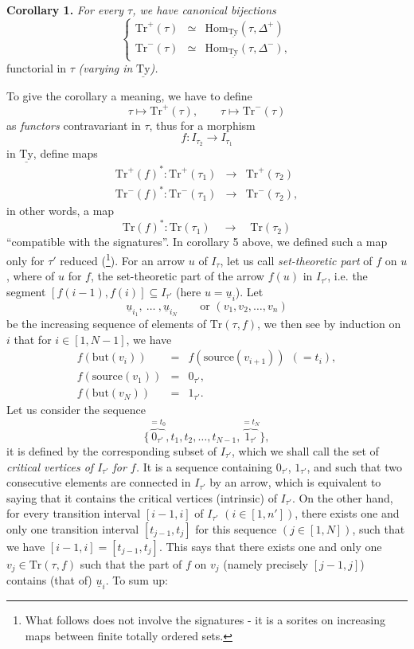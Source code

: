 \documentclass[11pt]{article}
\newcommand{\printedpage}[1]{\marginpar{\footnotesize p.~#1}}
\newcommand{\msp}[1]{\marginpar{\footnotesize [#1]}}
\newcommand{\Tr}{\mathrm{Tr}}
\newcommand{\Hom}{\mathrm{Hom}}
\newcommand{\uTy}{\underline{\mathrm{Ty}}}
\begin{document}
\textbf{Corollary 1.} \textit{For every $\tau$, we have canonical bijections}
\[
\left\{
\begin{array}{lcl}
\Tr^+(\tau) & \simeq & \Hom_{\uTy}(\tau, \Delta^+) \\
\Tr^-(\tau) & \simeq & \Hom_{\uTy}(\tau, \Delta^-),
\end{array}
\right.
\]
functorial in $\tau$ \textit{(varying in} $\uTy$\textit{).}

\printedpage{26}

To give the corollary a meaning, we have to define
\[
\tau \longmapsto \Tr^+(\tau), \qquad \tau \longmapsto \Tr^-(\tau)
\]
as \textit{functors} contravariant in $\tau$, thus for a morphism
\[
f : I_{\tau_2} \longrightarrow I_{\tau_1}
\]
in $\uTy$, define maps
\msp{page 41}
\[
\begin{array}{rcl}
\Tr^+(f)^* : \Tr^+(\tau_1) & \longrightarrow & \Tr^+(\tau_2) \\
\Tr^-(f)^* : \Tr^-(\tau_1) & \longrightarrow & \Tr^-(\tau_2),
\end{array}
\]
in other words, a map
\[
\Tr(f)^* : \Tr(\tau_1) \quad \longrightarrow \quad \Tr(\tau_2)
\]
``compatible with the signatures''. In corollary 5 above, we defined such a map only for $\tau'$ reduced (\footnote[12]{What follows does not involve the signatures - it is a sorites on increasing maps between finite totally ordered sets.}). For an arrow $u$ of $I_\tau$, let us call \textit{set-theoretic part} of $f$ on $u$, where of $u$ for $f$, the set-theoretic part of the arrow $f(u)$ in $I_{\tau'}$, i.e. the segment $[f(i-1), f(i)] \subseteq I_{\tau'}$ (here $u = \underline{u}_i$). Let %
\[
\underline{u}_{i_1},\ \dots\ ,\underline{u}_{i_N} \qquad \text{or } (v_1, v_2, \dots, v_n)
\] %
be the increasing sequence of elements of $\Tr(\tau, f)$, we then see by induction on $i$ that for $i \in [1, N-1]$, we have
\[
\begin{array}{rcl}
f(\mathrm{but}(v_i)) & = & f(\mathrm{source}(v_{i+1}))\ \ (= t_i), \\
f(\mathrm{source}(v_1)) & = & 0_{\tau'}, \\
f(\mathrm{but}(v_N)) & = & 1_{\tau'}.
\end{array}
\]
Let us consider the sequence
\[
\{\overbrace{0_{\tau'}}^{= t_0}, t_1, t_2, \dots, t_{N-1}, \overbrace{1_{\tau'}}^{= t_N}\},
\]
it is defined by the corresponding subset of $I_{\tau'}$, which we shall call the set of \textit{critical vertices of $I_{\tau'}$ for $f$.} It is a sequence containing $0_{\tau'}$, $1_{\tau'}$, and such that two consecutive elements are connected in $I_{\tau'}$ by an arrow, which is equivalent to saying that it contains the critical vertices (intrinsic) of $I_{\tau'}$. On the other hand, for every transition interval $[i-1, i]$ of $I_{\tau'}$ $(i \in [1, n'])$, %
\printedpage{27}
\msp{page 42}
there exists one and only one transition interval $[t_{j-1}, t_j]$ for this sequence $(j \in [1, N])$, such that we have $[i-1, i] = [t_{j-1}, t_j]$. This says that there exists one and only one $v_j \in \Tr(\tau, f)$ such that the part of $f$ on $v_j$ (namely precisely $[j-1, j]$) contains (that of) $\underline{u}_i$. To sum up:
\end{document}
